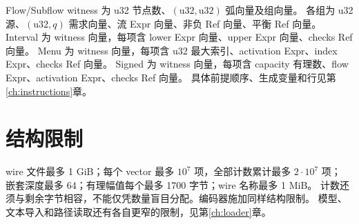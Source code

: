 Flow/Subflow witness 为 u32 节点数、$(\mathrm{u32},\mathrm{u32})$ 弧向量及组向量。
各组为 u32 源、$(\mathrm{u32},q)$ 需求向量、流 Expr 向量、非负 Ref 向量、平衡 Ref 向量。
Interval 为 witness 向量，每项含 lower Expr 向量、upper Expr 向量、checks Ref 向量。
Menu 为 witness 向量，每项含 u32 最大索引、activation Expr、index Expr、checks Ref 向量。
Signed 为 witness 向量，每项含 capacity 有理数、flow Expr、activation Expr、checks Ref 向量。
具体前提顺序、生成变量和行见第\ref{ch:instructions}章。

\section{结构限制}
wire 文件最多 1 GiB；每个 vector 最多 $10^7$ 项，全部计数累计最多 $2\cdot10^7$ 项；
嵌套深度最多 64；有理幅值每个最多 1700 字节；wire 名称最多 1 MiB。
计数还须与剩余字节相容，不能仅凭数量盲目分配。编码器施加同样结构限制。
模型、文本导入和路径读取还有各自更窄的限制，见第\ref{ch:loader}章。
